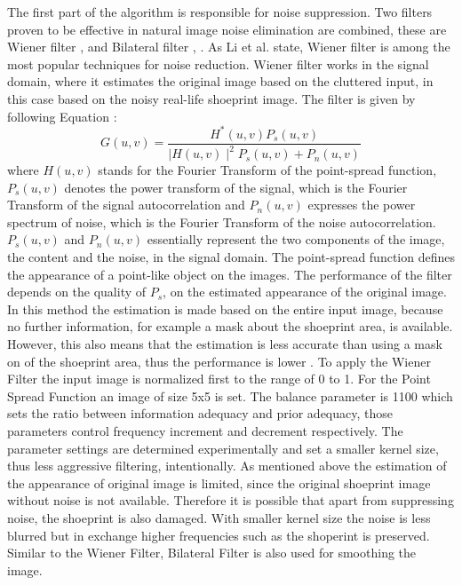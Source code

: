 \documentclass[draft,final]{vutinfth} %
\begin{document}
\par
The first part of the algorithm is responsible for noise suppression.
Two filters proven to be effective in natural image noise elimination are combined, these are Wiener filter \cite{li2014rapid}, \cite{chatterjee2011patch} and Bilateral filter \cite{zhang2016simultaneous}, \cite{huang2013self}.
As Li et al. \cite{li2014rapid} state, Wiener filter is among the most popular techniques for noise reduction.
Wiener filter works in the signal domain, where it estimates the original image based on the cluttered input, in this case based on the noisy real-life shoeprint image. 
The filter is given by following Equation \cite{Win}:
\[ G(u, v) = \frac{H^*(u,v) P_s(u, v)}{\mid H(u,v)\mid ^2 P_s (u, v) + P_n (u, v)}  \]
where $H(u,v)$ stands for the Fourier Transform of the point-spread function, $P_s (u,v)$ denotes the power transform of the signal, which is the Fourier Transform of the signal autocorrelation and $P_n(u,v)$ expresses the power spectrum of noise, which is the Fourier Transform of the noise autocorrelation.
 $P_s(u,v)$ and  $P_n(u,v)$ essentially represent the two components of the image, the content and the noise, in the signal domain.
The point-spread function defines the appearance of a point-like object on the images.
The performance of the filter depends on the quality of $P_s$, on the estimated appearance of the original image.
In this method the estimation is made based on the entire input image, because no further information, for example a mask about the shoeprint  area, is available.
However, this also means that the estimation is less accurate than using a mask on of the shoeprint area, thus the performance is lower \cite{chatterjee2011patch}.
To apply the Wiener Filter the input image is normalized first to the range of 0 to 1.
For the Point Spread Function an image of size 5x5 is set.
The balance parameter is 1100 which sets the ratio between information adequacy and prior adequacy, those parameters control frequency increment and decrement respectively.
The parameter settings are determined experimentally and set a smaller kernel size, thus less aggressive filtering, intentionally.
As mentioned above the estimation of the appearance of original image is limited, since the original shoeprint image without noise is not available.
Therefore it is possible that apart from suppressing noise, the shoeprint is also damaged.
With smaller kernel size the noise is less blurred but in exchange higher frequencies such as the shoperint is preserved.
Similar to the Wiener Filter, Bilateral Filter is also used for smoothing the image.
\end{document}

